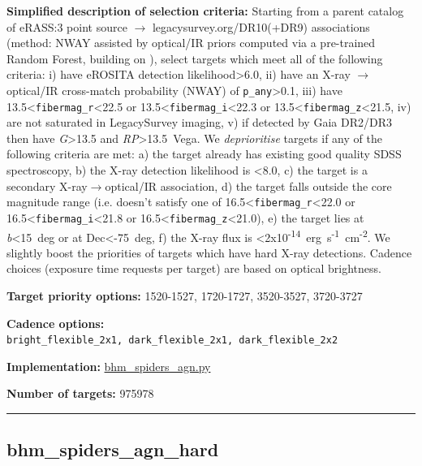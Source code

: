 \noindent\textbf{Simplified description of selection criteria:} Starting from a
parent catalog of eRASS:3 point source $\rightarrow$ legacysurvey.org/DR10(+DR9)
associations (method: NWAY assisted by optical/IR priors computed via a
pre-trained Random Forest, building on
\citealt{Salvato2022}), select targets which meet all of the following criteria:
i) have eROSITA detection likelihood\textgreater6.0, ii) have an X-ray $\rightarrow$
optical/IR cross-match probability (NWAY) of
\texttt{p\_any}\textgreater0.1, iii) have
13.5\textless{}\texttt{fibermag\_r}\textless22.5 or
13.5\textless{}\texttt{fibermag\_i}\textless22.3 or
13.5\textless{}\texttt{fibermag\_z}\textless21.5, iv) are not saturated
in LegacySurvey imaging, v) if detected by Gaia DR2/DR3 then have
\emph{G}\textgreater13.5 and \emph{RP}\textgreater13.5~Vega. We
\emph{deprioritise} targets if any of the following criteria are met: a)
the target already has existing good quality SDSS spectroscopy, b) the
X-ray detection likelihood is \textless8.0, c) the target is a secondary
X-ray$\rightarrow$optical/IR association, d) the target falls outside the core
magnitude range (i.e. doesn't satisfy one of
16.5\textless{}\texttt{fibermag\_r}\textless22.0 or
16.5\textless{}\texttt{fibermag\_i}\textless21.8 or
16.5\textless{}\texttt{fibermag\_z}\textless21.0), e) the target lies at
\textbar{}\emph{b}\textbar\textless15~deg or at Dec\textless-75~deg, f)
the X-ray flux is
\textless2x10\textsuperscript{-14}~erg~s\textsuperscript{-1}~cm\textsuperscript{-2}.
We slightly boost the priorities of targets which have hard X-ray
detections. Cadence choices (exposure time requests per target) are
based on optical brightness.


\noindent\textbf{Target priority options:} 1520-1527, 1720-1727, 3520-3527,
3720-3727

\noindent\textbf{Cadence options:}
\texttt{bright\_flexible\_2x1,\ dark\_flexible\_2x1,\ dark\_flexible\_2x2}

\noindent\textbf{Implementation:}
\href{https://github.com/sdss/target_selection/blob/1.0.37/python/target_selection/cartons/bhm_spiders_agn.py}{bhm\_spiders\_agn.py}

\noindent\textbf{Number of targets:} 975978

\begin{center}\rule{0.5\linewidth}{0.5pt}\end{center}

\hypertarget{bhm_spiders_agn_hard_plan1.0.37}{%
\subsection{bhm\_spiders\_agn\_hard}\label{bhm_spiders_agn_hard_plan1.0.37}}

